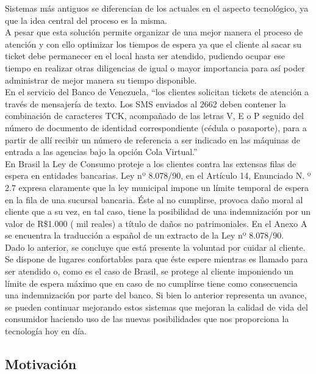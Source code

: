 Sistemas más antiguos se diferencian de los actuales en el aspecto tecnológico, ya que la idea central del proceso es la misma.\\ 

A pesar que esta solución permite organizar de una mejor manera el proceso de atención y con ello optimizar los tiempos de espera ya que el cliente al sacar su ticket debe permanecer en el local hasta ser atendido, pudiendo ocupar ese tiempo en realizar otras diligencias de igual o mayor importancia para así poder administrar de mejor manera su tiempo disponible.\\

En el servicio del Banco de Venezuela, “los clientes solicitan tickets de atención a través de mensajería de texto. Los SMS enviados al 2662 deben contener la combinación de caracteres TCK, acompañado de las letras V, E o P seguido del número de documento de identidad correspondiente (cédula o pasaporte), para a partir de allí recibir un número de referencia a ser indicado en las máquinas de entrada a las agencias bajo la opción Cola Virtual.”\cite{Ins12}\\

En Brasil la Ley de Consumo proteje a los clientes contra las extensas filas de espera en entidades bancarias. Ley nº 8.078/90, en el Artículo 14, Enunciado N. º 2.7 expresa claramente que la ley municipal impone un límite temporal de espera en la fila de una sucursal bancaria. Éste al no cumplirse, provoca daño moral al cliente que a su vez, en tal caso, tiene la posibilidad de una indemnización por un valor de R\$1.000 ( mil reales) a título de daños no patrimoniales\cite{Pre90}. En el Anexo A se encuentra la traducción a español de un extracto de la Ley nº 8.078/90.\\

Dado lo anterior, se concluye que está presente la voluntad por cuidar al cliente. Se dispone de lugares confortables para que éste espere mientras es llamado para ser atendido o, como es el caso de Brasil, se protege al cliente imponiendo un límite de espera máximo que en caso de no cumplirse tiene como consecuencia una indemnización por parte del banco. Si bien lo anterior representa un avance, se pueden continuar mejorando estos sistemas que mejoran la calidad de vida del consumidor haciendo uso de las nuevas posibilidades que nos proporciona la tecnología hoy en día.\\

\subsection{Motivación}

